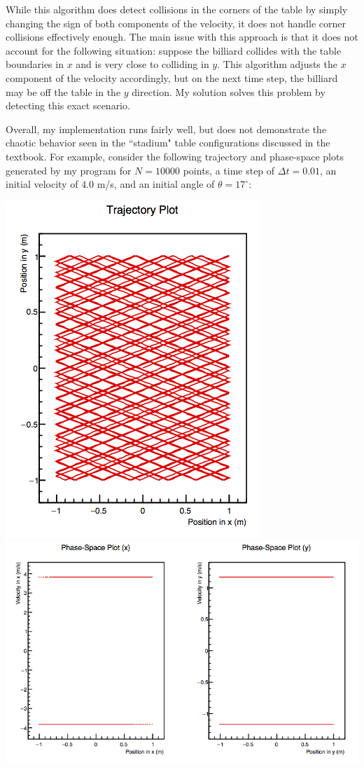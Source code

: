 \documentclass[12pt]{amsart}
\begin{document}
While this algorithm does detect collisions in the corners of the table by simply changing the sign of both components of the velocity, it does
not handle corner collisions effectively enough. The main issue with this approach is that it does not account for the following situation: suppose
the billiard collides with the table boundaries in $x$ and is very close to colliding in $y$. This algorithm adjusts the $x$ component of the velocity
accordingly, but on the next time step, the billiard may be off the table in the $y$ direction. My solution solves this problem by detecting this exact
scenario.

Overall, my implementation runs fairly well, but does not demonstrate the chaotic behavior seen in the ``stadium" table configurations discussed
in the textbook. For example, consider the following trajectory and phase-space plots generated by my program for $N = 10000$ points, a time
step of $\Delta t = 0.01$, an initial velocity of $4.0$ m/s, and an initial angle of $\theta = 17^{\circ}$:

\begin{center}
	\includegraphics{graph1.png}
	\includegraphics{graph2.png}
\end{center}
\end{document}
